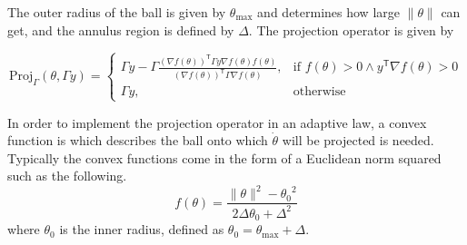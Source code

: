 The outer radius of the ball is given by $\theta_{\text{max}}$ and determines how large $\|\theta\|$ can get, and the annulus region is defined by $\Delta$.
The projection operator is given by

\begin{equation}
  \text{Proj}_{\Gamma}(\theta,\Gamma y)=
  \begin{cases}
    \Gamma y- \Gamma \frac{(\nabla f(\theta))^{\mathsf{T}}\Gamma y \nabla f(\theta) f(\theta)}{(\nabla f(\theta))^{\mathsf{T}}\Gamma \nabla f(\theta)}, & \text{if }f(\theta)>0\wedge y^{\mathsf{T}}\nabla f(\theta)>0 \\
    \Gamma y, & \text{otherwise}
  \end{cases}
\end{equation}

In order to implement the projection operator in an adaptive law, a convex function is which describes the ball onto which $\dot{\theta}$ will be projected is needed.
Typically the convex functions come in the form of a Euclidean norm squared such as the following.
\begin{equation}
  f(\theta)=\frac{\|\theta\|^{2}-{\theta_{0}}^{2}}{2\Delta{\theta_{0}}+\Delta^{2}}
\end{equation}
where $\theta_{0}$ is the inner radius, defined as $\theta_{0}=\theta_{\text{max}}+\Delta$.
